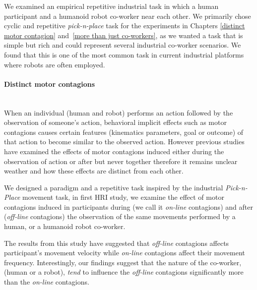 We examined an empirical repetitive industrial task in which a human participant and a humanoid robot co-worker near each other. We primarily chose cyclic and repetitive \textit{pick-n-place} task for the experiments in Chapters \ref{distinct motor contagion} and~\ref{more than just co-workers}, as we wanted a task that is simple but rich and could represent several industrial co-worker scenarios. We found that this is one of the most common task in current industrial platforms where robots are often employed.


\paragraph*{\LARGE {Distinct motor contagions\\}\\}



When an individual (human and robot) performs an action followed by the observation of someone's action, behavioral implicit effects such as motor contagions causes certain features (kinematics parameters, goal or outcome) of that action to become similar to the observed action. However previous studies have examined the effects of motor contagions induced either during the observation of action or after but never together therefore it remains unclear weather and how these effects are distinct from each other.

We designed a paradigm and a repetitive task inspired by the industrial \textit{Pick-n-Place} movement task, in first HRI study, we examine the effect of motor contagions induced in participants during (we call it \textit{on-line} contagions) and after (\textit{off-line} contagions) the observation of the same movements performed by a human, or a humanoid robot co-worker.

The results from this study have suggested that \textit{off-line} contagions affects participant's movement velocity while \textit{on-line} contagions affect their movement frequency. Interestingly, our findings suggest that the nature of the co-worker, (human or a robot), \textit{tend} to influence the \textit{off-line} contagions significantly more than the \textit{on-line} contagions.


